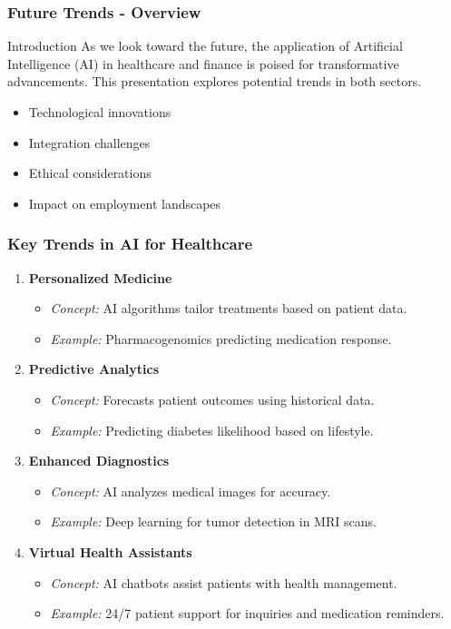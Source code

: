 \documentclass[aspectratio=169]{beamer}
\begin{document}
\begin{frame}[fragile]
    \frametitle{Future Trends - Overview}
    \begin{block}{Introduction}
        As we look toward the future, the application of Artificial Intelligence (AI) in healthcare and finance is poised for transformative advancements. This presentation explores potential trends in both sectors.
    \end{block}
    \begin{itemize}
        \item Technological innovations
        \item Integration challenges
        \item Ethical considerations
        \item Impact on employment landscapes
    \end{itemize}
\end{frame}

\begin{frame}[fragile]
    \frametitle{Key Trends in AI for Healthcare}
    \begin{enumerate}
        \item \textbf{Personalized Medicine}
            \begin{itemize}
                \item \textit{Concept:} AI algorithms tailor treatments based on patient data.
                \item \textit{Example:} Pharmacogenomics predicting medication response.
            \end{itemize}
        \item \textbf{Predictive Analytics}
            \begin{itemize}
                \item \textit{Concept:} Forecasts patient outcomes using historical data.
                \item \textit{Example:} Predicting diabetes likelihood based on lifestyle.
            \end{itemize}
        \item \textbf{Enhanced Diagnostics}
            \begin{itemize}
                \item \textit{Concept:} AI analyzes medical images for accuracy.
                \item \textit{Example:} Deep learning for tumor detection in MRI scans.
            \end{itemize}
        \item \textbf{Virtual Health Assistants}
            \begin{itemize}
                \item \textit{Concept:} AI chatbots assist patients with health management.
                \item \textit{Example:} 24/7 patient support for inquiries and medication reminders.
            \end{itemize}
    \end{enumerate}
\end{frame}
\end{document}
